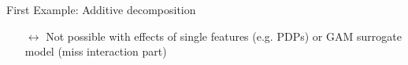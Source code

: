 \documentclass[11pt,compress,t,notes=noshow, aspectratio=169, xcolor=table]{beamer}
\newcommand{\open}{}
\newcommand{\close}{}
\begin{document}
\begin{frame}{First Example: Additive decomposition}
\begin{example}
\begin{itemize}
        \pause
        \item[$\leftrightarrow$] Not possible with effects of single features (e.g. PDPs) or GAM surrogate model (miss interaction part)
    
        
        
    \end{itemize}

    \end{example}

\end{frame}




    
\end{document}
